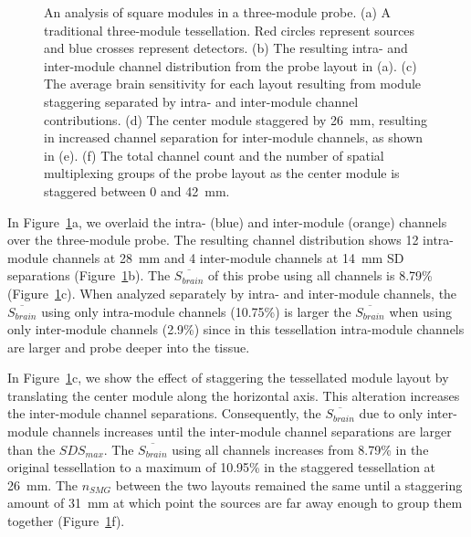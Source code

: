 \begin{figure}
\begin{center}
    \end{center}
    \caption {An analysis of square modules in a three-module probe. (a) A traditional three-module tessellation. Red circles represent sources and blue crosses represent detectors. (b) The resulting intra- and inter-module channel distribution from the probe layout in (a). (c) The average brain sensitivity for each layout resulting from module staggering separated by intra- and inter-module channel contributions. (d) The center module staggered by 26~mm, resulting in increased channel separation for inter-module channels, as shown in (e). (f) The total channel count and the number of spatial multiplexing groups of the probe layout as the center module is staggered between 0 and 42~mm.}
    \label{fig:stagger}
\end{figure} 

In Figure~\ref{fig:stagger}a, we overlaid the intra- (blue) and inter-module (orange) channels over the three-module probe. The resulting channel distribution shows 12 intra-module channels at 28~mm and 4 inter-module channels at 14~mm \ac{SD} separations (Figure~\ref{fig:stagger}b). The $\overline{S_{brain}}$ of this probe using all channels is 8.79\% (Figure~\ref{fig:stagger}c). When analyzed separately by intra- and inter-module channels, the $\overline{S_{brain}}$ using only intra-module channels (10.75\%) is larger the $\overline{S_{brain}}$ when using only inter-module channels (2.9\%) since in this tessellation intra-module channels are larger and probe deeper into the tissue.  

In Figure~\ref{fig:stagger}c, we show the effect of staggering the tessellated module layout by translating the center module along the horizontal axis. This alteration increases the inter-module channel separations. Consequently, the $\overline{S_{brain}}$ due to only inter-module channels increases until the inter-module channel separations are larger than the $SDS_{max}$. The $\overline{S_{brain}}$ using all channels increases from 8.79\% in the original tessellation to a maximum of 10.95\% in the staggered tessellation at 26~mm. The $n_{SMG}$ between the two layouts remained the same until a staggering amount of 31~mm at which point the sources are far away enough to group them together (Figure~\ref{fig:stagger}f). 



